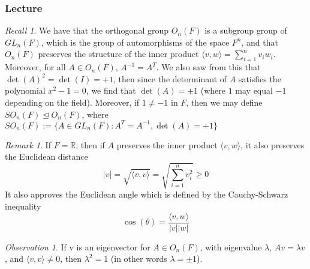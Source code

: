 \documentclass[12pt]{article}
\theoremstyle{definition}
\theoremstyle{remark}
\newtheorem{rmk}[thm]{Remark}
\newtheorem{obs}[thm]{Observation}
\newtheorem*{rec}{Recall}
\numberwithin{equation}{section}
\newcommand\R{\mathbb R}    %
\newcommand\nsub{\trianglelefteq}
\begin{document}
\vspace{15pt}

\subsubsection{Lecture}


\begin{rec}
        We have that the orthogonal group $O_n(F)$ is a subgroup group of $GL_n(F)$, which is the group of automorphisms of the space $F^n$, and that $O_n(F)$ preserves the structure of the inner product $\langle v,w \rangle = \sum\limits_{i=1}^nv_iw_i$. Moreover, for all $A \in O_n(F)$, $A^{-1} = A^T$. We also saw from this that $\det(A)^2 = \det(I) = +1$, then since the determinant of $A$ satisfies the polynomial $x^2 - 1 = 0$, we find that $\det(A) = \pm 1$ (where $1$ may equal $-1$ depending on the field). Moreover, if $1 \neq -1$ in $F$, then we may define $SO_n(F) \nsub O_n(F)$, where $SO_n(F) := \{A\in GL_n(F): A^T = A^{-1}, \det(A) = +1\}$
\end{rec}


\vspace{15pt}

\begin{rmk}
        If $F = \R$, then if $A$ preserves the inner product $\langle v, w \rangle$, it also preserves the Euclidean distance \begin{equation}
                |v| = \sqrt{\langle v,v\rangle} = \sqrt{\sum\limits_{i=1}^nv_i^2} \geq 0
        \end{equation}
        It also approves the Euclidean angle which is defined by the Cauchy-Schwarz inequality \begin{equation}
                \cos(\theta) = \frac{\langle v,w \rangle}{|v||w|}
        \end{equation}
\end{rmk}

\vspace{15pt}

\begin{obs}
        If v is an eigenvector for $A \in O_n(F)$, with eigenvalue $\lambda$, $Av = \lambda v$, and $\langle v,v\rangle \neq 0$, then $\lambda^2 = 1$ (in other words $\lambda = \pm 1$).
\end{obs}

\vspace{15pt}
\end{document}
